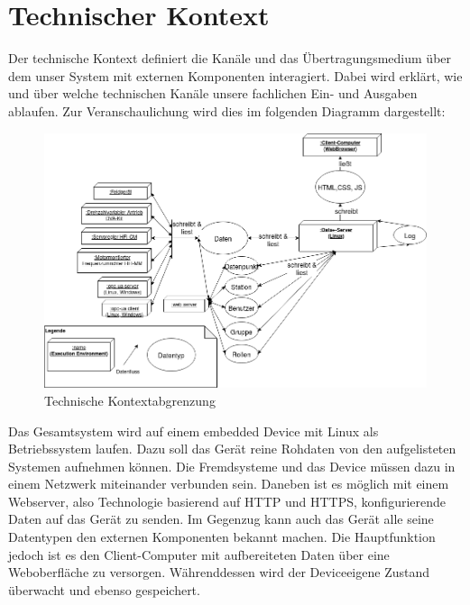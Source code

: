 \section{Technischer Kontext}
Der technische Kontext definiert die Kanäle und das Übertragungsmedium über dem unser System mit externen Komponenten interagiert. Dabei wird erklärt, wie und über welche technischen Kanäle unsere fachlichen Ein- und Ausgaben ablaufen. Zur Veranschaulichung wird dies im folgenden Diagramm dargestellt:

\begin{figure}[h]
	\centering
	\includegraphics[width=1\textwidth]{Graphics/technische_kontextabgrenzung.png}
	\caption{Technische Kontextabgrenzung}
	\label{fig:technische_kontextabgrenzung}
\end{figure}
Das Gesamtsystem wird auf einem embedded Device mit Linux als Betriebssystem laufen. Dazu soll das Gerät reine Rohdaten von den aufgelisteten Systemen aufnehmen können. Die Fremdsysteme und das Device müssen dazu in einem Netzwerk miteinander verbunden sein. Daneben ist es möglich mit einem Webserver, also Technologie basierend auf HTTP und HTTPS, konfigurierende Daten auf das Gerät zu senden. Im Gegenzug kann auch das Gerät alle seine Datentypen den externen Komponenten bekannt machen. Die Hauptfunktion jedoch ist es den Client-Computer mit aufbereiteten Daten über eine Weboberfläche zu versorgen. Währenddessen wird der Deviceeigene Zustand überwacht und ebenso gespeichert.
